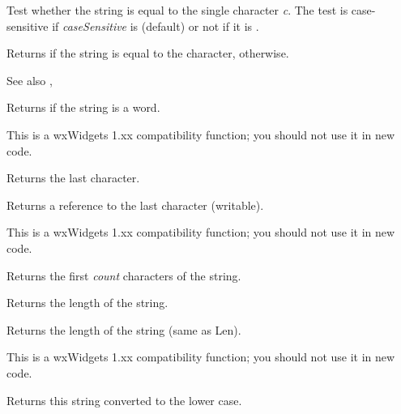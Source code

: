 
Test whether the string is equal to the single character {\it c}. The test is
case-sensitive if {\it caseSensitive} is \true (default) or not if it is \false.

Returns \true if the string is equal to the character, \false otherwise.

See also , 


\label{wxstringisword}


Returns \true if the string is a word.

This is a wxWidgets 1.xx compatibility function; you should not use it in new code.


\label{wxstringlast}


Returns the last character.


Returns a reference to the last character (writable).

This is a wxWidgets 1.xx compatibility function; you should not use it in new code.


\label{wxstringleft}


Returns the first {\it count} characters of the string.


\label{wxstringlen}


Returns the length of the string.


\label{wxstringlength}


Returns the length of the string (same as Len).

This is a wxWidgets 1.xx compatibility function; you should not use it in new code.


\label{wxstringlower}


Returns this string converted to the lower case.


